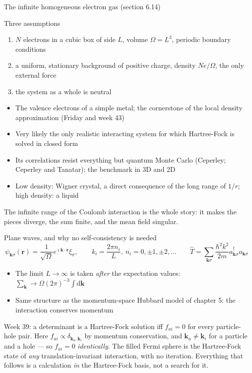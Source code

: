 \documentclass[aspectratio=169,10pt]{beamer}
\newcommand{\mbbox}[1]{%
  \begin{tcolorbox}[colback=paleblue,colframe=uioblue,title={\bfseries Many-body connection}]
  #1
  \end{tcolorbox}}
\newcommand{\ad}[1]{a_{#1}^{\dagger}}
\newcommand{\dd}{\mathrm{d}}
\begin{document}
\begin{frame}{The infinite homogeneous electron gas (section 6.14)}
  \begin{block}{Three assumptions}
    \begin{enumerate}
      \item $N$ electrons in a cubic box of side $L$, volume $\Omega=L^3$, periodic boundary conditions
      \item a uniform, stationary background of positive charge, density $Ne/\Omega$, the only external force
      \item the system as a whole is neutral
    \end{enumerate}
  \end{block}
  \begin{itemize}
    \item The valence electrons of a simple metal; the cornerstone of the local density approximation (Friday and week 43)
    \item Very likely the only realistic interacting system for which Hartree-Fock is solved \alert{in closed form}
    \item Its correlations resist everything but quantum Monte Carlo (Ceperley; Ceperley and Tanatar): the benchmark in 3D and 2D
    \item Low density: Wigner crystal, a direct consequence of the long range of $1/r$; high density: a liquid
  \end{itemize}
  \vspace{0.3em}
  \centering The infinite range of the Coulomb interaction is the whole story: it makes the pieces diverge, the sum finite, and the mean field singular.
\end{frame}

\begin{frame}{Plane waves, and why no self-consistency is needed}
  \[
    \psi_{\bm k\sigma}(\bm r)=\frac{1}{\sqrt\Omega}e^{\imath\bm k\cdot\bm r}\xi_\sigma,
    \qquad k_i=\frac{2\pi n_i}{L},\ n_i=0,\pm1,\pm2,\dots
    \qquad
    \hat T=\sum_{\bm k\sigma}\frac{\hbar^2k^2}{2m}\ad{\bm k\sigma}a_{\bm k\sigma}
  \]
  \begin{itemize}
    \item The limit $L\to\infty$ is taken \emph{after} the expectation values: $\sum_{\bm k}\to\Omega(2\pi)^{-3}\int\dd\bm k$
    \item Same structure as the momentum-space Hubbard model of chapter 5: the interaction conserves momentum
  \end{itemize}
  \mbbox{Week 39: a determinant is a Hartree-Fock solution iff $f_{ai}=0$ for every particle-hole pair. Here $f_{ai}\propto\delta_{\bm k_a,\bm k_i}$ by momentum conservation, and $\bm k_a\ne\bm k_i$ for a particle and a hole --- so $f_{ai}=0$ \emph{identically}. The filled Fermi sphere is the Hartree-Fock state of \emph{any} translation-invariant interaction, with no iteration. Everything that follows is a calculation \emph{in} the Hartree-Fock basis, not a search for it.}
\end{frame}
\end{document}
